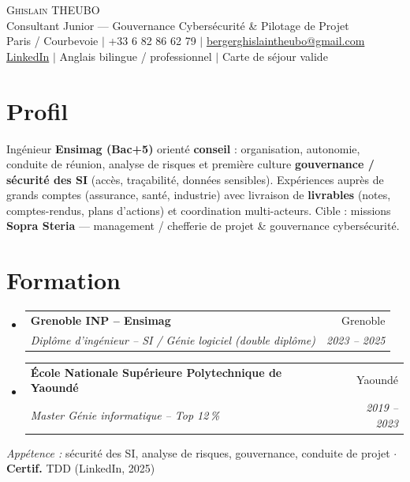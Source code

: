 \documentclass[letterpaper,10.5pt]{article}
\makeatletter
\newcommand{\resumeSubheading}[4]{\vspace{-2pt}\item\begin{tabular*}{0.97\textwidth}[t]{l@{\extracolsep{\fill}}r}\textbf{#1} & #2 \\\textit{\small#3} & \textit{\small #4} \\\end{tabular*}\vspace{-6pt}}
\newcommand{\resumeSubHeadingListStart}{\begin{itemize}[leftmargin=0.12in, label={}]}
\newcommand{\resumeSubHeadingListEnd}{\end{itemize}}
\makeatother
\begin{document}
\begin{center}
{\Huge \scshape Ghislain THEUBO} \\ \vspace{1pt}
{\large Consultant Junior --- Gouvernance Cybers\'ecurit\'e \& Pilotage de Projet} \\ \vspace{2pt}
\small Paris / Courbevoie $|$ +33 6 82 86 62 79 $|$ \href{mailto:bergerghislaintheubo@gmail.com}{bergerghislaintheubo@gmail.com} \\
\href{https://www.linkedin.com/in/berger-ghislain}{LinkedIn} $|$ Anglais bilingue / professionnel $|$ Carte de s\'ejour valide
\end{center}
\vspace{-8pt}
\section{Profil}
\small{Ing\'enieur \textbf{Ensimag (Bac+5)} orient\'e \textbf{conseil} : organisation, autonomie, conduite de r\'eunion, analyse de risques et premi\`ere culture \textbf{gouvernance / s\'ecurit\'e des SI} (acc\`es, tra\c{c}abilit\'e, donn\'ees sensibles). Exp\'eriences aupr\`es de grands comptes (assurance, sant\'e, industrie) avec livraison de \textbf{livrables} (notes, comptes-rendus, plans d'actions) et coordination multi-acteurs. Cible : missions \textbf{Sopra Steria} --- management / chefferie de projet \& gouvernance cybers\'ecurit\'e.}
\vspace{-2pt}
\section{Formation}
\resumeSubHeadingListStart
  \resumeSubheading{Grenoble INP -- Ensimag}{Grenoble}{Dipl\^ome d'ing\'enieur -- SI / G\'enie logiciel (double dipl\^ome)}{2023 -- 2025}
  \resumeSubheading{\'Ecole Nationale Sup\'erieure Polytechnique de Yaound\'e}{Yaound\'e}{Master G\'enie informatique -- Top 12\,\%}{2019 -- 2023}
\resumeSubHeadingListEnd
\vspace{-4pt}
\small{\textit{App\'etence :} s\'ecurit\'e des SI, analyse de risques, gouvernance, conduite de projet $\cdot$ \textbf{Certif.} TDD (LinkedIn, 2025)}
\end{document}
